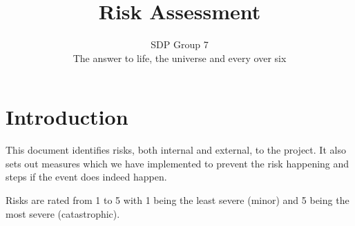 \documentclass{article}
\begin{document}
\title{Risk Assessment}
\author{SDP Group 7\\
The answer to life, the universe and every over six
}
\maketitle

\section{Introduction}

This document identifies risks, both internal and external, to the project. It
also sets out measures which we have implemented to prevent the risk
happening and steps if the event does indeed happen.

Risks are rated from 1 to 5 with 1 being the least severe (minor) and 5 being
the most severe (catastrophic).
\end{document}
